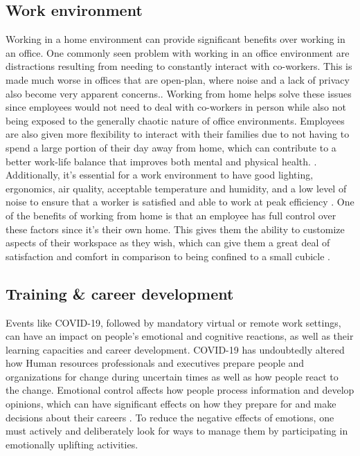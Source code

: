 \documentclass[12pt]{article}
\begin{document}
\subsection*{Work environment}

Working in a home environment can provide significant benefits over working in an office. One commonly seen problem with working in an office environment are distractions resulting from needing to constantly interact with co-workers. This is made much worse in offices that are open-plan, where noise and a lack of privacy also become very apparent concerns.\cite{Kim2013}. Working from home helps solve these issues since employees would not need to deal with co-workers in person while also not being exposed to the generally chaotic nature of office environments. Employees are also given more flexibility to interact with their families due to not having to spend a large portion of their day away from home, which can contribute to a better work-life balance that improves both mental and physical health. \cite{Xiao2021}. Additionally, it’s essential for a work environment to have good lighting, ergonomics, air quality, acceptable temperature and humidity, and a low level of noise to ensure that a worker is satisfied and able to work at peak efficiency \cite{Xiao2021}. One of the benefits of working from home is that an employee has full control over these factors since it’s their own home. This gives them the ability to customize aspects of their workspace as they wish, which can give them a great deal of satisfaction and comfort in comparison to being confined to a small cubicle \cite{Xiao2021}.

\subsection*{Training & career development}

Events like COVID-19, followed by mandatory virtual or remote work settings, can have an impact on people's emotional and cognitive reactions, as well as their learning capacities and career development. COVID-19 has undoubtedly altered how Human resources professionals and executives prepare people and organizations for change during uncertain times as well as how people react to the change. Emotional control affects how people process information and develop opinions, which can have significant effects on how they prepare for and make decisions about their careers \cite{Restubog2020}. To reduce the negative effects of emotions, one must actively and deliberately look for ways to manage them by participating in emotionally uplifting activities.
\end{document}

